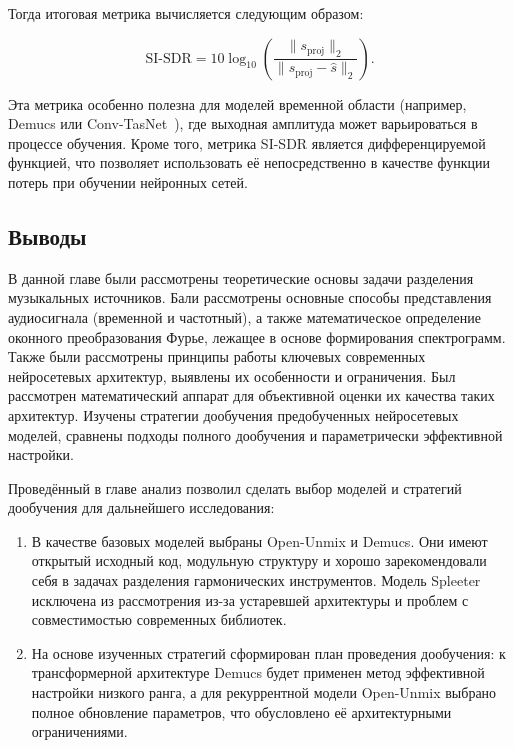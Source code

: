 \documentclass[14pt]{extarticle}
\begin{document}
Тогда итоговая метрика вычисляется следующим образом:

\begin{equation*}
    \mathrm{SI\text{-}SDR} = 10 \log_{10} \left( \frac{\lVert s_{\mathrm{proj}} \rVert_2}{\lVert s_{\mathrm{proj}} - \hat{s} \rVert_2} \right).
\end{equation*}

Эта метрика особенно полезна для моделей временной области (например, Demucs или Conv-TasNet~\cite{demucs}), 
где выходная амплитуда может варьироваться в процессе обучения.
Кроме того, метрика SI-SDR является дифференцируемой функцией, что позволяет использовать её непосредственно в качестве 
функции потерь при обучении нейронных сетей.

\subsection{Выводы}
В данной главе были рассмотрены теоретические основы задачи разделения музыкальных источников. 
Бали рассмотрены основные способы представления аудиосигнала (временной и частотный), а также математическое определение
оконного преобразования Фурье, лежащее в основе формирования спектрограмм.
Также были рассмотрены принципы работы ключевых современных нейросетевых архитектур, выявлены их особенности и ограничения. Был рассмотрен
математический аппарат для объективной оценки их качества таких архитектур.
Изучены стратегии дообучения предобученных нейросетевых моделей, сравнены подходы полного дообучения и параметрически эффективной настройки.

Проведённый в главе анализ позволил сделать выбор моделей и стратегий дообучения для дальнейшего исследования:
\begin{enumerate}[label=\arabic*)]
    \item В качестве базовых моделей выбраны Open-Unmix и Demucs. Они имеют открытый исходный код, 
	модульную структуру и хорошо зарекомендовали себя в задачах разделения гармонических инструментов. 
	Модель Spleeter исключена из рассмотрения из-за устаревшей архитектуры и проблем с совместимостью современных библиотек.
    \item На основе изученных стратегий сформирован план проведения дообучения: к трансформерной архитектуре Demucs будет 
	применен метод эффективной настройки низкого ранга, а для рекуррентной модели Open-Unmix выбрано полное обновление параметров,
	что обусловлено её архитектурными ограничениями.
\end{enumerate}
\end{document}

